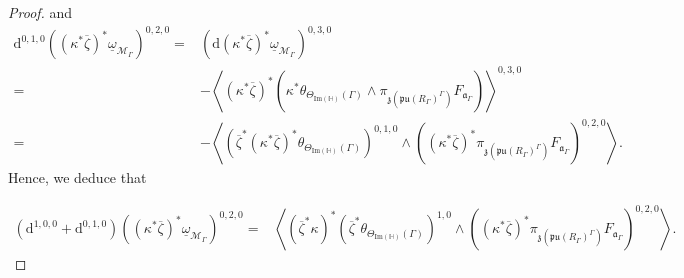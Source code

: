 \documentclass[psamsfonts]{amsart}
\theoremstyle{plain}
\theoremstyle{definition}{
\newtheorem{defi}{Definition}[section]
\newtheorem{ass}{Assumption}
\newtheorem*{nota}{Notation}}
\theoremstyle{remark}{
\newtheorem{rem}{Remark}
\newtheorem{ex}{Example}}
\theoremstyle{plain}{
\newtheorem{thm}{Theorem}[section]
\newtheorem{lem}{Lemma}[section]
\newtheorem{cor}{Corollary}[section]
\newtheorem{prop}{Proposition}[section]
\newtheorem{con}{Conjecture}[section]}
\newcommand{\m}[1]{{\mathrm{#1}}}
\begin{document}
\begin{proof}
and 
\begin{align*}
    \m{d}^{0,1,0}((\kappa^*\overline{\zeta})^*\underline{\omega}_{\mathcal{M}_\Gamma})^{0,2,0}=&(\m{d}(\kappa^*\overline{\zeta})^*\underline{\omega}_{\mathcal{M}_\Gamma})^{0,3,0}\\
    =&-\left<(\kappa^*\overline{\zeta})^*\left(\kappa^*\theta_{\Theta_{\m{Im}(\mathbb{H})}(\Gamma)}\wedge\pi_{\mathfrak{z}(\mathfrak{pu}(R_\Gamma)^{\Gamma})}F_{\mathfrak{a}_\Gamma}\right)\right>^{0,3,0}\\
    =&-\left<(\overline{\zeta}^*(\kappa^*\overline{\zeta})^*\theta_{\Theta_{\m{Im}(\mathbb{H})}(\Gamma)})^{0,1,0}\wedge((\kappa^*\overline{\zeta})^*\pi_{\mathfrak{z}(\mathfrak{pu}(R_\Gamma)^{\Gamma})}F_{\mathfrak{a}_\Gamma})^{0,2,0}\right>.
\end{align*}
Hence, we deduce that 

\begin{align*}
    (\m{d}^{1,0,0}+\m{d}^{0,1,0})((\kappa^*\overline{\zeta})^*\underline{\omega}_{\mathcal{M}_\Gamma})^{0,2,0}=&\left<(\overline{\zeta}^*\kappa)^*(\overline{\zeta}^*\theta_{\Theta_{\m{Im}(\mathbb{H})}(\Gamma)})^{1,0}\wedge((\kappa^*\overline{\zeta})^*\pi_{\mathfrak{z}(\mathfrak{pu}(R_\Gamma)^{\Gamma})}F_{\mathfrak{a}_\Gamma})^{0,2,0}\right>.
\end{align*}


\end{proof}
\end{document}
